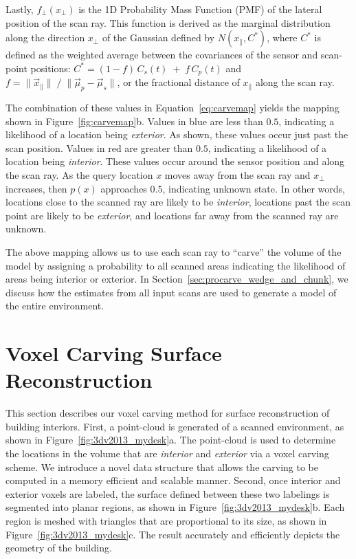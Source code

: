 \documentclass[12pt,onecolumn,oneside]{book}
\begin{document}
Lastly, $f_{\perp}(x_{\perp})$ is the 1D Probability Mass Function (PMF) of the lateral position of the scan ray.  This function is derived as the marginal distribution along the direction $x_{\perp}$ of the Gaussian defined by $N(x_{\parallel}, C^*)$, where $C^*$ is defined as the weighted average between the covariances of the sensor and scan-point positions:  $C^* = ( 1-f ) \,  C_s(t) \; + \; f \, C_p(t)$ and $f = \| \vec{x}_{\parallel} \| \; / \; \| \vec{\mu}_p - \vec{\mu}_s \|$, or the fractional distance of $x_{\parallel}$ along the scan ray.

The combination of these values in Equation~\ref{eq:carvemap} yields the mapping shown in Figure~\ref{fig:carvemap}b.  Values in blue are less than $0.5$, indicating a likelihood of a location being {\it exterior}.  As shown, these values occur just past the scan position.  Values in red are greater than $0.5$, indicating a likelihood of a location being {\it interior}.  These values occur around the sensor position and along the scan ray.  As the query location $x$ moves away from the scan ray and $x_{\perp}$ increases, then $p(x)$ approaches $0.5$, indicating unknown state.  In other words, locations close to the scanned ray are likely to be {\it interior}, locations past the scan point are likely to be {\it exterior}, and locations far away from the scanned ray are unknown.

The above mapping allows us to use each scan ray to ``carve'' the volume of the model by assigning a probability to all scanned areas indicating the likelihood of areas being interior or exterior.  In Section~\ref{sec:procarve_wedge_and_chunk}, we discuss how the estimates from all input scans are used to generate a model of the entire environment.  

\section{Voxel Carving Surface Reconstruction}
\label{sec:3dv2013}

This section describes our voxel carving method for surface reconstruction of building interiors.  First, a point-cloud is generated of a scanned environment, as shown in Figure~\ref{fig:3dv2013_mydesk}a.  The point-cloud is used to determine the locations in the volume that are {\it interior} and {\it exterior} via a voxel carving scheme.  We introduce a novel data structure that allows the carving to be computed in a memory efficient and scalable manner.  Second, once interior and exterior voxels are labeled, the surface defined between these two labelings is segmented into planar regions, as shown in Figure~\ref{fig:3dv2013_mydesk}b.  Each region is meshed with triangles that are proportional to its size, as shown in Figure~\ref{fig:3dv2013_mydesk}c.  The result accurately and efficiently depicts the geometry of the building.
\end{document}
